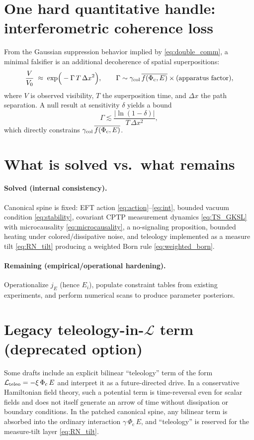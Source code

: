 \documentclass[reprint,amsmath,amssymb,aps,showkeys]{revtex4-2}
\theoremstyle{remark}
\newcommand{\Phic}{\Phi_{\mathrm{c}}}
\newcommand{\Eth}{E}
\newcommand{\Lag}{\mathcal{L}}
\begin{document}
\section{One hard quantitative handle: interferometric coherence loss}
From the Gaussian suppression behavior implied by \eqref{eq:double_comm}, a minimal falsifier is an
additional decoherence of spatial superpositions:
\begin{equation}
\frac{V}{V_0}\;\approx\;\exp\!\Big(-\Gamma\,T\,\Delta x^2\Big),\qquad
\Gamma \sim \gamma_{\rm col}\,\overline{f(\Phic,\Eth)}\times(\text{apparatus factor}),
\label{eq:visibility}
\end{equation}
where $V$ is observed visibility, $T$ the superposition time, and $\Delta x$ the path separation.
A null result at sensitivity $\delta$ yields a bound
\[
\Gamma \lesssim \frac{|\ln(1-\delta)|}{T\,\Delta x^2},
\]
which directly constrains $\gamma_{\rm col}\,\overline{f(\Phic,\Eth)}$.

\section{What is solved vs.\ what remains}
\paragraph{Solved (internal consistency).}
Canonical spine is fixed: EFT action \eqref{eq:action}--\eqref{eq:int}, bounded vacuum condition
\eqref{eq:stability}, covariant CPTP measurement dynamics \eqref{eq:TS_GKSL} with microcausality
\eqref{eq:microcausality}, a no-signaling proposition, bounded heating under colored/dissipative noise,
and teleology implemented as a measure tilt \eqref{eq:RN_tilt} producing a weighted Born rule \eqref{eq:weighted_born}.

\paragraph{Remaining (empirical/operational hardening).}
Operationalize $j_E$ (hence $E_i$), populate constraint tables from existing experiments,
and perform numerical scans to produce parameter posteriors.

\appendix
\section{Legacy teleology-in-$\Lag$ term (deprecated option)}
\label{app:legacy}
Some drafts include an explicit bilinear ``teleology'' term of the form
$\Lag_{\rm teleo}=-\xi\,\Phic\,\Eth$ and interpret it as a future-directed drive.
In a conservative Hamiltonian field theory, such a potential term is time-reversal even for scalar
fields and does not itself generate an arrow of time without dissipation or boundary conditions.
In the patched canonical spine, any bilinear term is absorbed into the ordinary interaction
$\gamma\,\Phic\,\Eth$, and ``teleology'' is reserved for the measure-tilt layer \eqref{eq:RN_tilt}.
\end{document}
